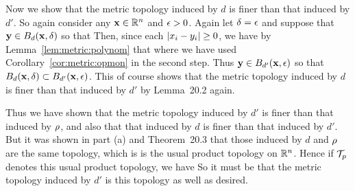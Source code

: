 {  Now we show that the metric topology induced by $d$ is finer than that induced by $d'$.
  So again consider any $\mathbf{x} \in {\mathbb{R}}^n$ and $\epsilon > 0$.
  Again let $\delta = \epsilon$ and suppose that $\mathbf{y} \in B_d(\mathbf{x}, \delta)$ so that
  Then, since each $\left| x_i - y_i \right| \geq 0$, we have by Lemma~\ref{lem:metric:polynom} that
  where we have used Corollary~\ref{cor:metric:opmon} in the second step.
  Thus $\mathbf{y} \in B_{d'}(\mathbf{x}, \epsilon)$ so that $B_d(\mathbf{x}, \delta) \subset B_{d'}(\mathbf{x}, \epsilon)$.
  This of course shows that the metric topology induced by $d$ is finer than that induced by $d'$ by Lemma~20.2 again.

  Thus we have shown that the metric topology induced by $d'$ is finer than that induced by $\rho$, and also that that induced by $d$ is finer than that induced by $d'$.
  But it was shown in part (a) and Theorem~20.3 that those induced by $d$ and $\rho$ are the same topology, which is is the usual product topology on ${\mathbb{R}}^n$.
  Hence if $\mathcal{T}_p$ denotes this usual product topology, we have
  So it must be that the metric topology induced by $d'$ is this topology as well as desired.
}



